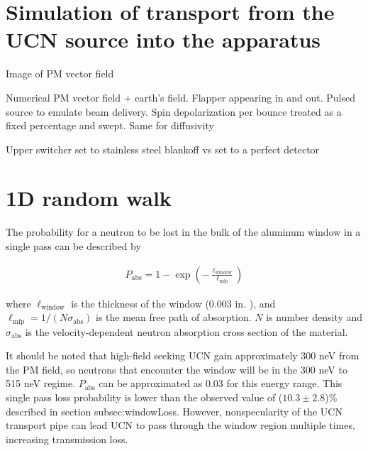 
\section{Simulation of transport from the UCN source into the apparatus}\label{sec:switcher_wye_transport_monte_carlo}


Image of PM vector field

Numerical PM vector field + earth's field. Flapper appearing in and out. Pulsed source to emulate beam delivery. Spin depolarization per bounce treated as a fixed percentage and swept. Same for diffusivity

Upper switcher set to stainless steel blankoff vs set to a perfect detector



\section{1D random walk}\label{sec:1D_random_walk}


The probability for a neutron to be lost in the bulk of the aluminum window in a single pass can be described by

\begin{gather}
   P_\text{abs} = 1 - \exp \left( - \frac{\ell_\text{window} }{ \ell_\text{mfp} } \right)
\end{gather}

where $\ell_\text{window}$ is the thickness of the window (0.003 in. ), and $\ell_\text{mfp} = 1 / (N\sigma_\text{abs})$ is the mean free path of absorption. $N$ is number density and $\sigma_\text{abs}$ is the velocity-dependent neutron absorption cross section of the material. 

It should be noted that high-field seeking UCN gain approximately 300 neV from the PM field, so neutrons that encounter the window will be in the 300 neV to 515 neV regime. $P_\text{abs}$ can be approximated as 0.03 for this energy range. This single pass loss probability is lower than the observed value of ($10.3\pm 2.8$)\% described in section subsec:windowLoss. However, nonspecularity of the UCN transport pipe can lead UCN to pass through the window region multiple times, increasing transmission loss. 

